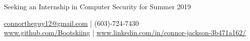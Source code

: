 \documentclass[12pt,letterpaper]{deedy-resume} %
\begin{document}
%
%



{ %
{\large Seeking an Internship in Computer Security for Summer 2019\par} %
\sectionspace
\faEnvelope\space\href{mailto:connortheguy12@gmail.com}{connortheguy12@gmail.com} %
{\space | \space} %
\faPhone\space (603)-724-7430 \\ %
\faGithub\space\space {}\url{www.github.com/Bootskiing} %
{\space | \space}
\faLinkedin\space{}\url{www.linkedin.com/in/connor-jackson-3b471a162/} %
}

%
%
\end{document}
